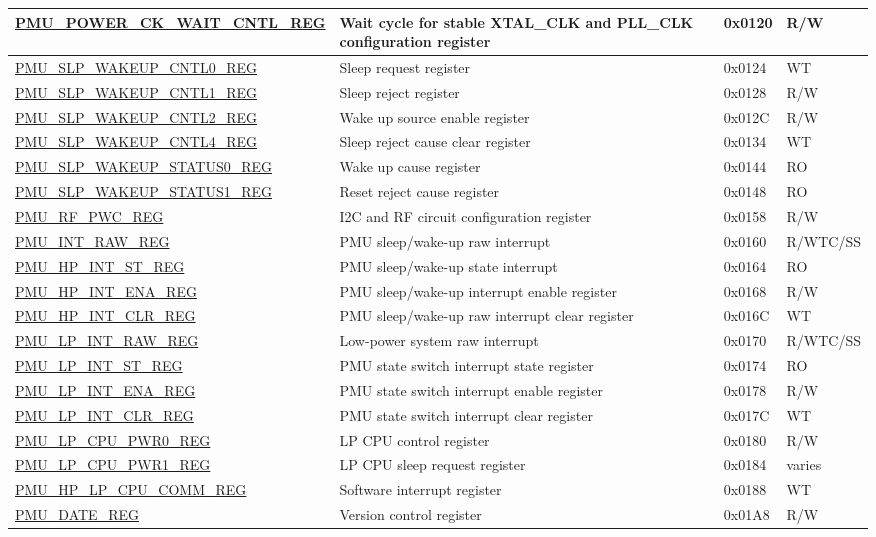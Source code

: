 \begin{longtable}{ | l | L{6cm} | l | l | }
\hyperref[regdesc:PMUPOWERCKWAITCNTLREG]{PMU\_POWER\_CK\_WAIT\_CNTL\_REG} & Wait cycle for stable XTAL\_CLK and PLL\_CLK configuration register & 0x0120 & R/W \\ \hline
\hyperref[regdesc:PMUSLPWAKEUPCNTL0REG]{PMU\_SLP\_WAKEUP\_CNTL0\_REG} & Sleep request register & 0x0124 & WT \\ \hline
\hyperref[regdesc:PMUSLPWAKEUPCNTL1REG]{PMU\_SLP\_WAKEUP\_CNTL1\_REG} & Sleep reject register & 0x0128 & R/W \\ \hline
\hyperref[regdesc:PMUSLPWAKEUPCNTL2REG]{PMU\_SLP\_WAKEUP\_CNTL2\_REG} & Wake up source enable register & 0x012C & R/W \\ \hline
\hyperref[regdesc:PMUSLPWAKEUPCNTL4REG]{PMU\_SLP\_WAKEUP\_CNTL4\_REG} & Sleep reject cause clear register & 0x0134 & WT \\ \hline
\hyperref[regdesc:PMUSLPWAKEUPSTATUS0REG]{PMU\_SLP\_WAKEUP\_STATUS0\_REG} & Wake up cause register & 0x0144 & RO \\ \hline
\hyperref[regdesc:PMUSLPWAKEUPSTATUS1REG]{PMU\_SLP\_WAKEUP\_STATUS1\_REG} & Reset reject cause register & 0x0148 & RO \\ \hline
\hyperref[regdesc:PMURFPWCREG]{PMU\_RF\_PWC\_REG} & I2C and RF circuit configuration register & 0x0158 & R/W \\ \hline
\hyperref[regdesc:PMUINTRAWREG]{PMU\_INT\_RAW\_REG} & PMU sleep/wake-up raw interrupt & 0x0160 & R/WTC/SS \\ \hline
\hyperref[regdesc:PMUHPINTSTREG]{PMU\_HP\_INT\_ST\_REG} & PMU sleep/wake-up state interrupt & 0x0164 & RO \\ \hline
\hyperref[regdesc:PMUHPINTENAREG]{PMU\_HP\_INT\_ENA\_REG} & PMU sleep/wake-up interrupt enable register & 0x0168 & R/W \\ \hline
\hyperref[regdesc:PMUHPINTCLRREG]{PMU\_HP\_INT\_CLR\_REG} & PMU sleep/wake-up raw interrupt clear register & 0x016C & WT \\ \hline
\hyperref[regdesc:PMULPINTRAWREG]{PMU\_LP\_INT\_RAW\_REG} & Low-power system raw interrupt & 0x0170 & R/WTC/SS \\ \hline
\hyperref[regdesc:PMULPINTSTREG]{PMU\_LP\_INT\_ST\_REG} & PMU state switch interrupt state register & 0x0174 & RO \\ \hline
\hyperref[regdesc:PMULPINTENAREG]{PMU\_LP\_INT\_ENA\_REG} & PMU state switch interrupt enable register & 0x0178 & R/W \\ \hline
\hyperref[regdesc:PMULPINTCLRREG]{PMU\_LP\_INT\_CLR\_REG} & PMU state switch interrupt clear register & 0x017C & WT \\ \hline
\hyperref[regdesc:PMULPCPUPWR0REG]{PMU\_LP\_CPU\_PWR0\_REG} & LP CPU control register & 0x0180 & R/W \\ \hline
\hyperref[regdesc:PMULPCPUPWR1REG]{PMU\_LP\_CPU\_PWR1\_REG} & LP CPU sleep request register & 0x0184 & varies \\ \hline
\hyperref[regdesc:PMUHPLPCPUCOMMREG]{PMU\_HP\_LP\_CPU\_COMM\_REG} & Software interrupt register & 0x0188 & WT \\ \hline
\hyperref[regdesc:PMUDATEREG]{PMU\_DATE\_REG} & Version control register & 0x01A8 & R/W \\ \hline
\end{longtable}
